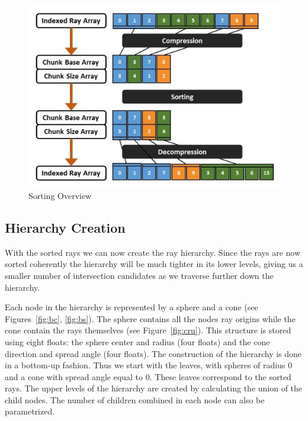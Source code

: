 \begin{figure}[!htb]
    \centering
    \includegraphics[scale=0.90]{Images/Sorting_Overview}
    \caption{\label{fig:so}Sorting Overview}
\end{figure}

\subsection{Hierarchy Creation}

With the sorted rays we can now create the ray hierarchy. Since the rays are now sorted coherently the hierarchy will be much tighter in its lower levels, giving us a smaller number of intersection candidates as we traverse further down the hierarchy.

\medskip

Each node in the hierarchy is represented by a sphere and a cone (see Figures~\ref{fig:bc}, \ref{fig:bs}).
The sphere contains all the nodes ray origins while the cone contain the rays themselves (see Figure~\ref{fig:cru}). This structure is stored using eight floats: the sphere center and radius (four floats) and the cone direction and spread angle (four floats). The construction of the hierarchy is done in a bottom-up fashion. Thus we start with the leaves, with spheres of radius $0$ and a cone with spread angle equal to $0$. These leaves correspond to the sorted rays. The upper levels of the hierarchy are created by calculating the union of the child nodes. The number of children combined in each node can also be parametrized. 


